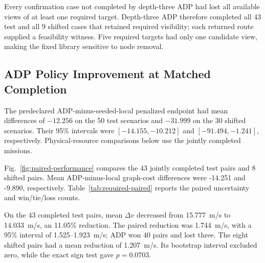 \documentclass{IEEEtaes}
\newcommand{\unit}[2]{#1~#2}
\newcommand{\RTJointTestN}{43}
\newcommand{\RTTestCostDiff}{-14.251}
\newcommand{\RTJointOodN}{8}
\newcommand{\RTOodCostDiff}{-9.890}
\begin{document}
Every confirmation case not completed by depth-three ADP had lost all available views of at least one required target. Depth-three ADP therefore completed all 43 test and all 9 shifted cases that retained required visibility; each returned route supplied a feasibility witness. Five required targets had only one candidate view, making the fixed library sensitive to node removal.

\subsection{ADP Policy Improvement at Matched Completion}

The predeclared ADP-minus-seeded-local penalized endpoint had mean differences of $-12.256$ on the 50 test scenarios and $-31.999$ on the 30 shifted scenarios. Their 95\% intervals were $[-14.155,-10.212]$ and $[-91.494,-1.241]$, respectively. Physical-resource comparisons below use the jointly completed missions.

Fig.~\ref{fig:paired-performance} compares the \RTJointTestN{} jointly completed test pairs and \RTJointOodN{} shifted pairs. Mean ADP-minus-local graph-cost differences were \RTTestCostDiff{} and \RTOodCostDiff{}, respectively. Table~\ref{tab:required-paired} reports the paired uncertainty and win/tie/loss counts.

On the 43 completed test pairs, mean $\Delta v$ decreased from \unit{15.777}{m/s} to \unit{14.033}{m/s}, an 11.05\% reduction. The paired reduction was \unit{1.744}{m/s}, with a 95\% interval of \unit{1.525--1.923}{m/s}; ADP won 40 pairs and lost three. The eight shifted pairs had a mean reduction of \unit{1.207}{m/s}. Its bootstrap interval excluded zero, while the exact sign test gave $p=0.0703$.
\end{document}
